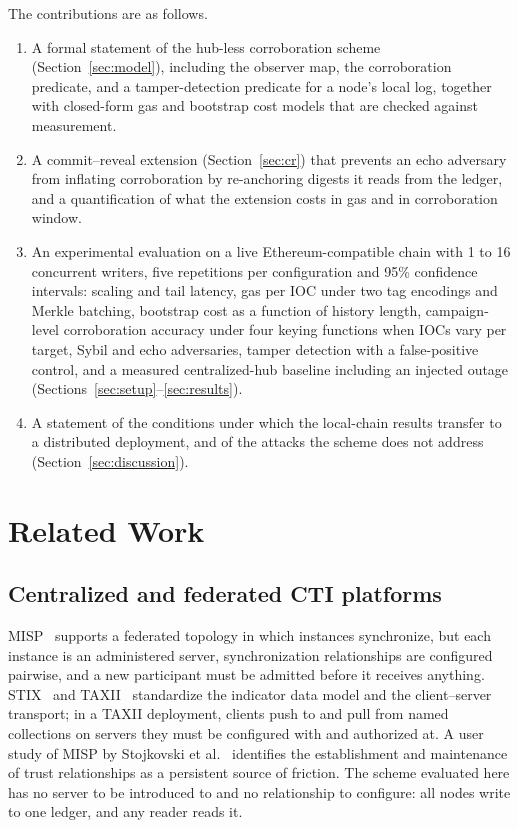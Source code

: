 \documentclass[conference]{IEEEtran}
\begin{document}
The contributions are as follows.
\begin{enumerate}
\item A formal statement of the hub-less corroboration scheme (Section~\ref{sec:model}), including the observer map, the corroboration predicate, and a tamper-detection predicate for a node's local log, together with closed-form gas and bootstrap cost models that are checked against measurement.
\item A commit--reveal extension (Section~\ref{sec:cr}) that prevents an echo adversary from inflating corroboration by re-anchoring digests it reads from the ledger, and a quantification of what the extension costs in gas and in corroboration window.
\item An experimental evaluation on a live Ethereum-compatible chain with 1 to 16 concurrent writers, five repetitions per configuration and 95\% confidence intervals: scaling and tail latency, gas per IOC under two tag encodings and Merkle batching, bootstrap cost as a function of history length, campaign-level corroboration accuracy under four keying functions when IOCs vary per target, Sybil and echo adversaries, tamper detection with a false-positive control, and a measured centralized-hub baseline including an injected outage (Sections~\ref{sec:setup}--\ref{sec:results}).
\item A statement of the conditions under which the local-chain results transfer to a distributed deployment, and of the attacks the scheme does not address (Section~\ref{sec:discussion}).
\end{enumerate}

\section{Related Work}

\subsection{Centralized and federated CTI platforms}
MISP~\cite{ref1} supports a federated topology in which instances synchronize, but each instance is an administered server, synchronization relationships are configured pairwise, and a new participant must be admitted before it receives anything. STIX~\cite{ref2} and TAXII~\cite{ref3} standardize the indicator data model and the client--server transport; in a TAXII deployment, clients push to and pull from named collections on servers they must be configured with and authorized at. A user study of MISP by Stojkovski et al.~\cite{ref8} identifies the establishment and maintenance of trust relationships as a persistent source of friction. The scheme evaluated here has no server to be introduced to and no relationship to configure: all nodes write to one ledger, and any reader reads it.
\end{document}

